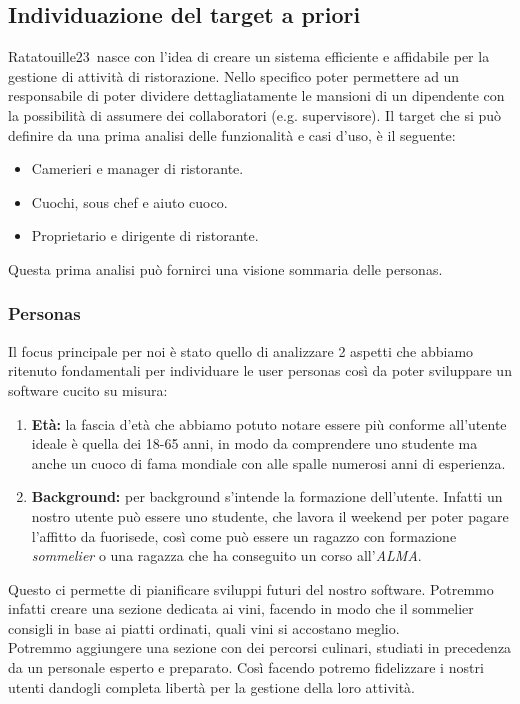 \subsection{Individuazione del target a priori}
Ratatouille23\texttrademark \ nasce con l'idea di creare un sistema efficiente e affidabile per la gestione di attività di ristorazione. Nello specifico poter permettere ad un responsabile di poter dividere dettagliatamente le mansioni di un dipendente con la possibilità di assumere dei collaboratori (e.g. supervisore).
Il target che si può definire da una prima analisi delle funzionalità e casi d'uso, è il seguente:
\begin{itemize}
  \item Camerieri e manager di ristorante.
  \item Cuochi, sous chef e aiuto cuoco.
  \item Proprietario e dirigente di ristorante.
\end{itemize}
Questa prima analisi può fornirci una visione sommaria delle personas.
\subsubsection{Personas}
Il focus principale per noi è stato quello di analizzare 2 aspetti che abbiamo ritenuto fondamentali
per individuare le user personas così da poter sviluppare un software cucito su misura:
\begin{enumerate}
  \item \textbf{Età:} la fascia d'età che abbiamo potuto notare essere più conforme all'utente ideale è quella dei 18-65 anni, in modo da comprendere uno studente ma anche un cuoco di fama mondiale con alle spalle numerosi anni di esperienza.
  \item \textbf{Background:} per background s'intende la formazione dell'utente. Infatti un nostro utente può essere uno studente, che lavora il weekend per poter pagare l'affitto da fuorisede, così come può essere un ragazzo con formazione \textit{sommelier} o una ragazza che ha conseguito un corso all'\textit{ALMA}.
\end{enumerate}
Questo ci permette di pianificare sviluppi futuri del nostro software. Potremmo infatti creare una sezione dedicata ai vini, facendo in modo che il sommelier consigli in base ai piatti ordinati, quali vini si accostano meglio.\\
Potremmo aggiungere una sezione con dei percorsi culinari, studiati in precedenza da un personale esperto e preparato. Così facendo potremo fidelizzare i nostri utenti dandogli completa libertà per la gestione della loro attività.
\newpage
